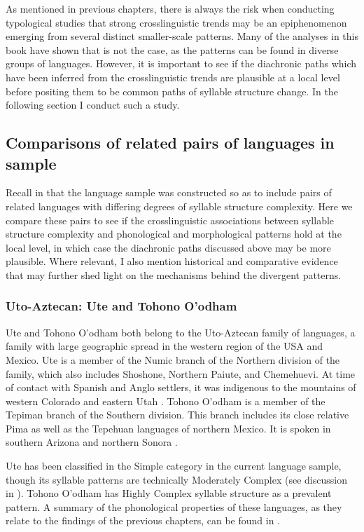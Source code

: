   As mentioned in previous chapters, there is always the risk when conducting typological studies that strong crosslinguistic trends may be an epiphenomenon emerging from several distinct smaller-scale patterns. Many of the analyses in this book have shown that is not the case, as the patterns can be found in diverse groups of languages. However, it is important to see if the diachronic paths which have been inferred from the crosslinguistic trends are plausible at a local level before positing them to be common paths of syllable structure change. In the following section I conduct such a study.

\subsection{Comparisons of related pairs of languages in sample}\label{sec:8.4.3}

  Recall in  that the language sample was constructed so as to include pairs of related languages with differing degrees of syllable structure complexity. Here we compare these pairs to see if the crosslinguistic associations between syllable structure complexity and phonological and morphological patterns hold at the local level, in which case the diachronic paths discussed above may be more plausible. Where relevant, I also mention historical and comparative evidence that may further shed light on the mechanisms behind the divergent patterns.

\subsubsection{{Uto-Aztecan:} {Ute} {and} {Tohono} {O’odham}}\label{sec:8.4.3.1}

  Ute and Tohono O’odham both belong to the Uto-Aztecan family of languages, a family with large geographic spread in the western region of the USA and Mexico. Ute is a member of the Numic branch of the Northern division of the family, which also includes Shoshone, Northern Paiute, and Chemehuevi. At time of contact with Spanish and Anglo settlers, it was indigenous to the mountains of western Colorado and eastern Utah \citep{Givón2011}. Tohono O’odham is a member of the Tepiman branch of the Southern division. This branch includes its close relative Pima as well as the Tepehuan languages of northern Mexico. It is spoken in southern Arizona and northern Sonora \citep{Zepeda1983}.

  Ute has been classified in the Simple category in the current language sample, though its syllable patterns are technically Moderately Complex (see discussion in ). Tohono O’odham has Highly Complex syllable structure as a prevalent pattern. A summary of the phonological properties of these languages, as they relate to the findings of the previous chapters, can be found in .

